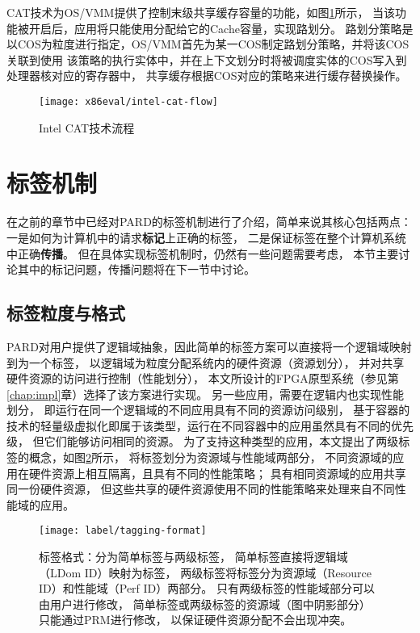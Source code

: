 CAT技术为OS/VMM提供了控制末级共享缓存容量的功能，如图\ref{fig:intel-cat-flow}所示，
当该功能被开启后，应用将只能使用分配给它的Cache容量，实现路划分。
路划分策略是以COS为粒度进行指定，OS/VMM首先为某一COS制定路划分策略，并将该COS关联到使用
该策略的执行实体中，并在上下文划分时将被调度实体的COS写入到处理器核对应的寄存器中，
共享缓存根据COS对应的策略来进行缓存替换操作。

\begin{figure}[H]
  \centering
  \texttt{[image: x86eval/intel-cat-flow]}
  \caption[Intel Cache Allocation Technology (CAT) 技术流程]{Intel CAT技术流程}
  \label{fig:intel-cat-flow}
\end{figure}



\section{标签机制}

在之前的章节中已经对PARD的标签机制进行了介绍，简单来说其核心包括两点：
一是如何为计算机中的请求\textbf{标记}上正确的标签，
二是保证标签在整个计算机系统中正确\textbf{传播}。
但在具体实现标签机制时，仍然有一些问题需要考虑，
本节主要讨论其中的标记问题，传播问题将在下一节中讨论。


\subsection{标签粒度与格式}

PARD对用户提供了逻辑域抽象，因此简单的标签方案可以直接将一个逻辑域映射到为一个标签，
以逻辑域为粒度分配系统内的硬件资源（资源划分），
并对共享硬件资源的访问进行控制（性能划分），
本文所设计的FPGA原型系统（参见第\ref{chap:impl}章）选择了该方案进行实现。
另一些应用，需要在逻辑内也实现性能划分，
即运行在同一个逻辑域的不同应用具有不同的资源访问级别，
基于容器的技术的轻量级虚拟化即属于该类型，运行在不同容器中的应用虽然具有不同的优先级，
但它们能够访问相同的资源。
为了支持这种类型的应用，本文提出了两级标签的概念，如图\ref{fig:tagging-format}所示，
将标签划分为资源域与性能域两部分，
不同资源域的应用在硬件资源上相互隔离，且具有不同的性能策略；
具有相同资源域的应用共享同一份硬件资源，
但这些共享的硬件资源使用不同的性能策略来处理来自不同性能域的应用。

\begin{figure}[tb]
  \centering
  \texttt{[image: label/tagging-format]}
  \caption[标签格式]{标签格式：分为简单标签与两级标签，
    简单标签直接将逻辑域（LDom ID）映射为标签，
    两级标签将标签分为资源域（Resource ID）和性能域（Perf ID）两部分。
    只有两级标签的性能域部分可以由用户进行修改，
    简单标签或两级标签的资源域（图中阴影部分）只能通过PRM进行修改，
    以保证硬件资源分配不会出现冲突。}
  \label{fig:tagging-format}
\end{figure}

